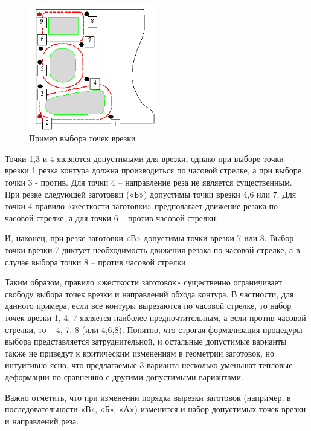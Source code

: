 \documentclass[12pt]{report}
\begin{document}
\begin{figure}
  \begin{center}
  \includegraphics[width=0.5\textwidth]{part-hardness.png}
  \caption{Пример выбора точек врезки}
  \label{part-hardness}
  \end{center}
\end{figure}

Точки 1,3 и 4 являются допустимыми для врезки,
однако при выборе точки врезки 1 резка контура
должна производиться по часовой стрелке,
а при выборе точки 3 - против.
Для точки 4 – направление реза не является существенным.
При резке следующей заготовки («Б»)
допустимы точки врезки 4,6 или 7.
Для точки 4 правило «жесткости заготовки»
предполагает движение резака по часовой стрелке,
а для точки 6 – против часовой стрелки.

И, наконец, при резке заготовки «В»
допустимы точки врезки 7 или 8.
Выбор точки врезки 7 диктует необходимость
движения резака по часовой стрелке,
а в случае выбора точки 8 – против часовой стрелки.

Таким образом, правило «жесткости заготовок»
существенно ограничивает свободу выбора точек
врезки и направлений обхода контура.
В частности, для данного примера,
если все контуры вырезаются по часовой стрелке,
то набор точек врезки 1, 4, 7
является наиболее предпочтительным,
а если против часовой стрелки, то – 4, 7, 8
(или 4,6,8).
Понятно, что строгая формализация процедуры
выбора представляется затруднительной,
и остальные допустимые варианты также не приведут
к критическим изменениям в геометрии заготовок,
но интуитивно ясно, что предлагаемые 3 варианта
несколько уменьшат тепловые деформации по сравнению
с другими допустимыми вариантами.

Важно отметить,
что при изменении порядка вырезки заготовок
(например, в последовательности «В», «Б», «А»)
изменится и набор допустимых точек врезки и направлений реза.
\end{document}
